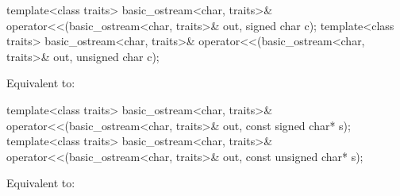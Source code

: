 \pnum
\begin{itemdecl}
template<class traits>
  basic_ostream<char, traits>& operator<<(basic_ostream<char, traits>& out, signed char c);
template<class traits>
  basic_ostream<char, traits>& operator<<(basic_ostream<char, traits>& out, unsigned char c);
\end{itemdecl}

\begin{itemdescr}
\pnum
\effects
Equivalent to: 
\end{itemdescr}

\pnum
\begin{itemdecl}
template<class traits>
  basic_ostream<char, traits>&
    operator<<(basic_ostream<char, traits>& out, const signed char* s);
template<class traits>
  basic_ostream<char, traits>&
    operator<<(basic_ostream<char, traits>& out, const unsigned char* s);
\end{itemdecl}

\begin{itemdescr}
\pnum
\effects
Equivalent to: 
\end{itemdescr}
